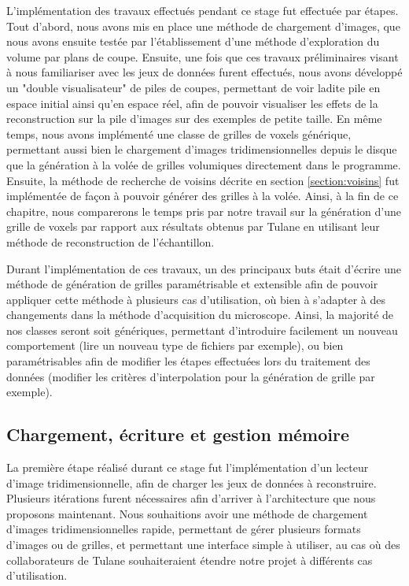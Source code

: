 {{        L'implémentation des travaux effectués pendant ce stage fut effectuée par étapes. Tout d'abord, nous avons mis en place une méthode de chargement d'images, que nous avons ensuite testée par l'établissement d'une méthode d'exploration du volume par plans de coupe. Ensuite, une fois que ces travaux préliminaires visant à nous familiariser avec les jeux de données furent effectués, nous avons développé un "double visualisateur" de piles de coupes, permettant de voir ladite pile en espace initial ainsi qu'en espace réel, afin de pouvoir visualiser les effets de la reconstruction sur la pile d'images sur des exemples de petite taille. En même temps, nous avons implémenté une classe de grilles de voxels générique, permettant aussi bien le chargement d'images tridimensionnelles depuis le disque que la génération à la volée de grilles volumiques directement dans le programme. Ensuite, la méthode de recherche de voisins décrite en section \ref{section:voisins} fut implémentée de façon à pouvoir générer des grilles à la volée. Ainsi, à la fin de ce chapitre, nous comparerons le temps pris par notre travail sur la génération d'une grille de voxels par rapport aux résultats obtenus par Tulane en utilisant leur méthode de reconstruction de l'échantillon.
	    
        Durant l'implémentation de ces travaux, un des principaux buts était d'écrire une méthode de génération de grilles paramétrisable et extensible afin de pouvoir appliquer cette méthode à plusieurs cas d'utilisation, où bien à s'adapter à des changements dans la méthode d'acquisition du microscope. Ainsi, la majorité de nos classes seront soit génériques, permettant d'introduire facilement un nouveau comportement (lire un nouveau type de fichiers par exemple), ou bien paramétrisables afin de modifier les étapes effectuées lors du traitement des données (modifier les critères d'interpolation pour la génération de grille par exemple).

        \subsection{Chargement, écriture et gestion mémoire}
        {
            La première étape réalisé durant ce stage fut l'implémentation d'un lecteur d'image tridimensionnelle, afin de charger les jeux de données à reconstruire. Plusieurs itérations furent nécessaires afin d'arriver à l'architecture que nous proposons maintenant. Nous souhaitions avoir une méthode de chargement d'images tridimensionnelles rapide, permettant de gérer plusieurs formats d'images ou de grilles, et permettant une interface simple à utiliser, au cas où des collaborateurs de Tulane souhaiteraient étendre notre projet à différents cas d'utilisation.
	        
}}}

